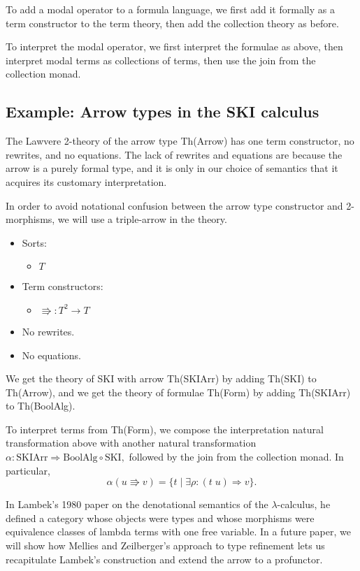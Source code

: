 \documentclass{llncs}
\newcommand{\maps}{\colon}
\begin{document}
To add a modal operator to a formula language, we first add it formally as a term constructor to the term theory, then add the collection theory as before.  

To interpret the modal operator, we first interpret the formulae as above, then interpret modal terms as collections of terms, then use the join from the collection monad.

\subsection{Example: Arrow types in the SKI calculus}

The Lawvere 2-theory of the arrow type Th(Arrow) has one term constructor, no rewrites, and no equations.  The lack of rewrites and equations are because the arrow is a purely formal type, and it is only in our choice of semantics that it acquires its customary interpretation.

In order to avoid notational confusion between the arrow type constructor and 2-morphisms, we will use a triple-arrow in the theory.
\begin{itemize}
  \item Sorts:
  \begin{itemize}
    \item $T$
  \end{itemize}
  \item Term constructors:
    \begin{itemize}
      \item $\Rrightarrow \maps T^2 \to T$
    \end{itemize}
  \item No rewrites.
  \item No equations.
\end{itemize}

We get the theory of SKI with arrow Th(SKIArr) by adding Th(SKI) to Th(Arrow), and we get the theory of formulae Th(Form) by adding Th(SKIArr) to Th(BoolAlg).

To interpret terms from Th(Form), we compose the interpretation natural transformation above with another natural transformation $\alpha\maps \mathrm{SKIArr} \Rightarrow \mathrm{BoolAlg} \circ \mathrm{SKI},$ followed by the join from the collection monad.  In particular, 
\[ \alpha(u \Rrightarrow v) = \{ t \;|\; \exists \rho\maps (t\; u) \Rightarrow v \}. \]

In Lambek's 1980 paper \cite{Lambek} on the denotational semantics of the $\lambda$-calculus, he defined a category whose objects were types and whose morphisms were equivalence classes of lambda terms with one free variable.  In a future paper, we will show how Mellies and Zeilberger's approach to type refinement lets us recapitulate Lambek's construction and extend the arrow to a profunctor.
\end{document}

